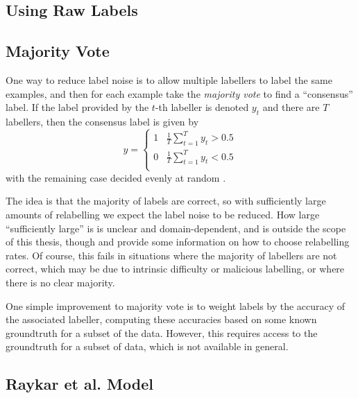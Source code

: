     \subsection{Using Raw Labels}
    \label{sec:raw-labels}


    \subsection{Majority Vote}
    \label{sec:majority-vote}

        One way to reduce label noise is to allow multiple labellers to label
        the same examples, and then for each example take the \emph{majority
        vote} to find a ``consensus'' label. If the label provided by the $t$-th
        labeller is denoted $y_t$ and there are $T$ labellers, then the
        consensus label is given by
        \begin{equation*}
            y = \begin{cases}
                1 & \frac{1}{T} \sum_{t = 1}^T y_t > 0.5\\
                0 & \frac{1}{T} \sum_{t = 1}^T y_t < 0.5\\
            \end{cases}
        \end{equation*}
        with the remaining case decided evenly at random \citep{raykar10}.

        The idea is that the majority of labels are correct, so with
        sufficiently large amounts of relabelling we expect the label noise to
        be reduced. How large ``sufficiently large'' is is unclear and
        domain-dependent, and is outside the scope of this thesis, though
        \citet{sheng08} and \citet{lin16} provide some information on how to
        choose relabelling rates. Of course, this fails in situations where the
        majority of labellers are not correct, which may be due to intrinsic
        difficulty or malicious labelling, or where there is no clear majority.

        One simple improvement to majority vote is to weight labels by the
        accuracy of the associated labeller, computing these accuracies based on
        some known groundtruth for a subset of the data. However, this requires
        access to the groundtruth for a subset of data, which is not available
        in general.

    \subsection{Raykar et al. Model}
    \label{sec:raykar}

